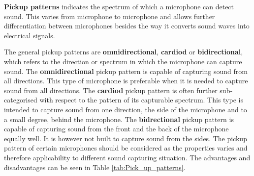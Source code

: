 \textbf{Pickup patterns} indicates the spectrum of which a microphone can detect sound. This varies from microphone to microphone and allows further differentiation between microphones besides the way it converts sound waves into electrical signals.

The general pickup patterns are \textbf{omnidirectional}, \textbf{cardiod} or \textbf{bidirectional}, which refers to the direction or spectrum in which the microphone can capture sound. The \textbf{omnidirectional} pickup pattern is capable of capturing sound from all directions. This type of microphone is preferable when it is needed to capture sound from all directions. The \textbf{cardiod} pickup pattern is often further sub-categorised with respect to the pattern of its capturable spectrum. This type is intended to capture sound from one direction, the side of the microphone and to a small degree, behind the microphone. The \textbf{bidrectional} pickup pattern is capable of capturing sound from the front and the back of the microphone equally well. It is however not built to capture sound from the sides. The pickup pattern of certain microphones should be considered as the properties varies and therefore applicability to different sound capturing situation. The advantages and disadvantages can be seen in Table \ref{tab:Pick_up_patterns}. \cite{Acoustics:Audio_production}

